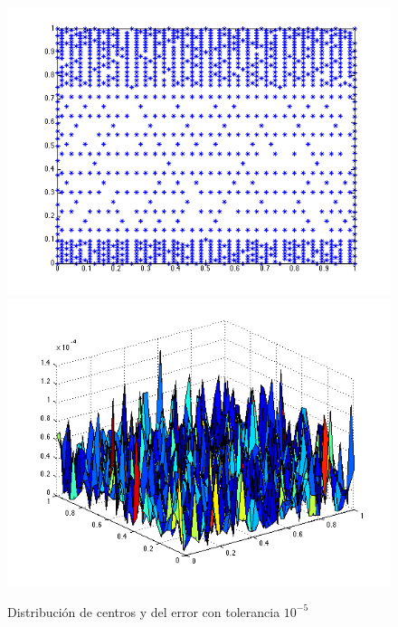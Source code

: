 \documentclass[11pt,a4paper]{article}
\begin{document}
\begin{figure}[H]
\begin{center}
\includegraphics[scale=.4]{edp1_tol5.png}
\includegraphics[scale=.4]{error_edp1_tol5.png}
\caption{Distribución de centros y del error con tolerancia $10^{-5}$}
\end{center}
\end{figure}
\end{document}
